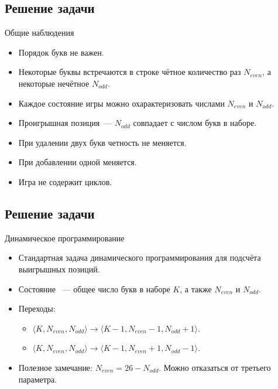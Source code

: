 \subsection{Решение задачи}

\begin{frame}[t]{Общие наблюдения}
\begin{itemize}
    \item Порядок букв не важен.
    \item Некоторые буквы встречаются в строке чётное количество раз $N_{even}$, а некоторые нечётное $N_{odd}$.
    \item Каждое состояние игры можно охарактеризовать числами $N_{even}$ и $N_{odd}$.
    \item Проигрышная позиция~--- $N_{odd}$ совпадает с числом букв в наборе.
    \item При удалении двух букв четность не меняется.
    \item При добавлении одной меняется.
    \item Игра не содержит циклов.
\end{itemize}
\end{frame}

\subsection{Решение задачи}

\begin{frame}[t]{Динамическое программирование}
\begin{itemize}
    \item Стандартная задача динамического программирования для подсчёта выигрышных позиций.
    \item Состояние ~--- общее число букв в наборе $K$, а также $N_{even}$ и $N_{odd}$.
    \item Переходы:
        \begin{itemize}
            \item $\langle K, N_{even}, N_{odd} \rangle \longrightarrow \langle K - 1, N_{even} - 1, N_{odd} + 1 \rangle$.
            \item $\langle K, N_{even}, N_{odd} \rangle \longrightarrow \langle K - 1, N_{even} + 1, N_{odd} - 1 \rangle$.
        \end{itemize}
    \item Полезное замечание: $N_{even} = 26 - N_{odd}$. Можно отказаться от третьего параметра.
\end{itemize}
\end{frame}

